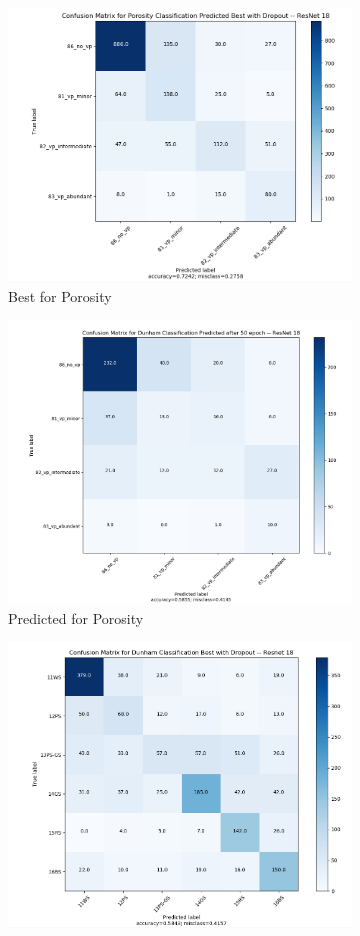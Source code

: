 \begin{figure}
\begin{subfigure}{.5\textwidth}
  \centering
  \includegraphics[width=.8\linewidth]{figures/04-baby_best.PNG}
  \caption{Best for Porosity}
  \label{fig:rescm_poro}
\end{subfigure}%
\begin{subfigure}{.5\textwidth}
  \centering
  \includegraphics[width=.8\linewidth]{figures/04-baby_pred.PNG}
  \caption{Predicted for Porosity}
  \label{fig:rescmpred_poro}
\end{subfigure}
\begin{subfigure}{.5\textwidth}
  \centering
  \includegraphics[width=.8\linewidth]{figures/04-dunham_best.PNG}

\end{subfigure}
\end{figure}
